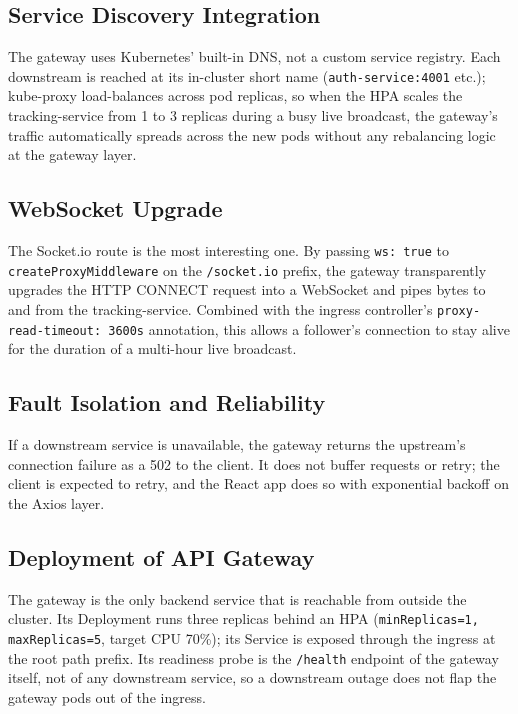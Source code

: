 \documentclass[11pt,a4paper]{article}
\begin{document}
\subsection{Service Discovery Integration}
The gateway uses Kubernetes' built-in DNS, not a custom service
registry.  Each downstream is reached at its in-cluster short name
(\texttt{auth-service:4001} etc.); kube-proxy load-balances across
pod replicas, so when the HPA scales the tracking-service from 1 to 3
replicas during a busy live broadcast, the gateway's traffic
automatically spreads across the new pods without any rebalancing
logic at the gateway layer.

\subsection{WebSocket Upgrade}
The Socket.io route is the most interesting one.  By passing
\texttt{ws: true} to \texttt{createProxyMiddleware} on the
\texttt{/socket.io} prefix, the gateway transparently upgrades the
HTTP CONNECT request into a WebSocket and pipes bytes to and from
the tracking-service.  Combined with the ingress controller's
\texttt{proxy-read-timeout: 3600s} annotation, this allows a
follower's connection to stay alive for the duration of a multi-hour
live broadcast.

\subsection{Fault Isolation and Reliability}
If a downstream service is unavailable, the gateway returns the
upstream's connection failure as a 502 to the client.  It does not
buffer requests or retry; the client is expected to retry, and the
React app does so with exponential backoff on the Axios layer.

\subsection{Deployment of API Gateway}
The gateway is the only backend service that is reachable from outside
the cluster.  Its Deployment runs three replicas behind an HPA
(\texttt{minReplicas=1, maxReplicas=5}, target CPU 70\%); its Service
is exposed through the ingress at the root path prefix.  Its readiness
probe is the \texttt{/health} endpoint of the gateway itself, not of
any downstream service, so a downstream outage does not flap the
gateway pods out of the ingress.

\end{document}
